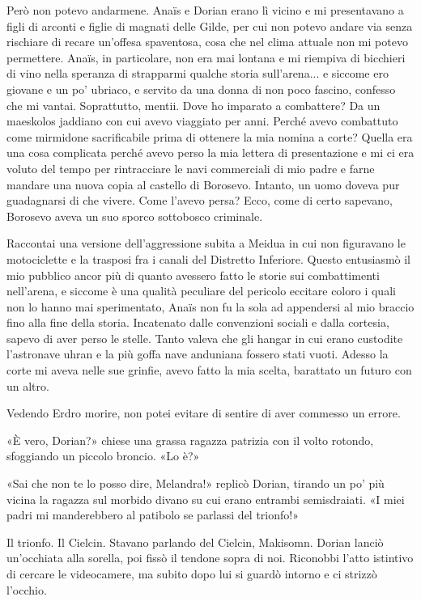 Però non potevo andarmene. Anaïs e Dorian erano lì vicino e mi
presentavano a figli di arconti e figlie di magnati delle Gilde, per cui
non potevo andare via senza rischiare di recare un'offesa spaventosa,
cosa che nel clima attuale non mi potevo permettere. Anaïs, in
particolare, non era mai lontana e mi riempiva di bicchieri di vino
nella speranza di strapparmi qualche storia sull'arena... e siccome ero
giovane e un po' ubriaco, e servito da una donna di non poco fascino,
confesso che mi vantai. Soprattutto, mentii. Dove ho imparato a
combattere? Da un maeskolos jaddiano con cui avevo viaggiato per anni.
Perché avevo combattuto come mirmidone sacrificabile prima di ottenere
la mia nomina a corte? Quella era una cosa complicata perché avevo perso
la mia lettera di presentazione e mi ci era voluto del tempo per
rintracciare le navi commerciali di mio padre e farne mandare una nuova
copia al castello di Borosevo. Intanto, un uomo doveva pur guadagnarsi
di che vivere. Come l'avevo persa? Ecco, come di certo sapevano,
Borosevo aveva un suo sporco sottobosco criminale.

Raccontai una versione dell'aggressione subita a Meidua in cui non
figuravano le motociclette e la trasposi fra i canali del Distretto
Inferiore. Questo entusiasmò il mio pubblico ancor più di quanto
avessero fatto le storie sui combattimenti nell'arena, e siccome è una
qualità peculiare del pericolo eccitare coloro i quali non lo hanno mai
sperimentato, Anaïs non fu la sola ad appendersi al mio braccio fino
alla fine della storia. Incatenato dalle convenzioni sociali e dalla
cortesia, sapevo di aver perso le stelle. Tanto valeva che gli hangar in
cui erano custodite l'astronave uhran e la più goffa nave anduniana
fossero stati vuoti. Adesso la corte mi aveva nelle sue grinfie, avevo
fatto la mia scelta, barattato un futuro con un altro.

Vedendo Erdro morire, non potei evitare di sentire di aver commesso un
errore.

«È vero, Dorian?» chiese una grassa ragazza patrizia con il volto
rotondo, sfoggiando un piccolo broncio. «Lo è?»

«Sai che non te lo posso dire, Melandra!» replicò Dorian, tirando un po'
più vicina la ragazza sul morbido divano su cui erano entrambi
semisdraiati. «I miei padri mi manderebbero al patibolo se parlassi del
trionfo!»

Il trionfo. Il Cielcin. Stavano parlando del Cielcin, Makisomn. Dorian
lanciò un'occhiata alla sorella, poi fissò il tendone sopra di noi.
Riconobbi l'atto istintivo di cercare le videocamere, ma subito dopo lui
si guardò intorno e ci strizzò l'occhio.

